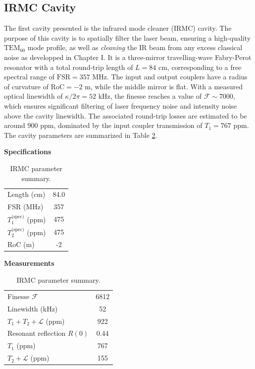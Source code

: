 \subsection{IRMC Cavity}
The first cavity presented is the infrared mode cleaner (IRMC) cavity. The purpose of this cavity is to spatially filter the laser beam, ensuring a high-quality $\text{TEM}_{00}$ mode profile, as well as \textit{cleaning} the IR beam from any excess classical noise as developped in Chapter I. It is a three-mirror travelling-wave Fabry-Perot resonator with a total round-trip length of $L = 84$ cm, corresponding to a free spectral range of $\mathrm{FSR} = 357$ MHz. The input and output couplers have a radius of curvature of $\mathrm{RoC} = -2$ m, while the middle mirror is flat. With a measured optical linewidth of $\kappa/2\pi = 52$ kHz, the finesse reaches a value of $\mathcal{F} \sim 7000$, which ensures significant filtering of laser frequency noise and intensity noise above the cavity linewidth. The associated round-trip losses are estimated to be around $900$ ppm, dominated by the input coupler transmission of $T_1 = 767$ ppm. The cavity parameters are summarized in Table \ref{tab:IRMC_params}. \\

\begin{table}[h!]
\centering
\captionsetup{width=\linewidth}
\begin{minipage}[t]{0.5\linewidth}
  \centering
  \textbf{Specifications}\par\medskip
  \begin{tabular}{lc}
    \hline
    Length (cm) & 84.0 \\
    FSR (MHz) & 357 \\
    $T_1^{\textrm{(spec)}}$ (ppm) & 475 \\
    $T_2^{\textrm{(spec)}}$ (ppm) & 475 \\
    RoC (m) & -2 \\ 
  \end{tabular}
\end{minipage}\hfill
\begin{minipage}[t]{0.5\linewidth}
  \centering
  \textbf{Measurements}\par\medskip
  \begin{tabular}{lc}
    \hline
    Finesse $\mathcal{F}$ & 6812 \\
    Linewidth (kHz) & 52 \\
    $T_1+T_2+\mathcal{L}$ (ppm) & 922 \\
    Resonant reflection $R(0)$ & 0.44 \\
    $T_1$ (ppm) & 767 \\
    $T_2+\mathcal{L}$ (ppm) & 155 \\ 
  \end{tabular}
\end{minipage}

\caption{IRMC parameter summary.}
\label{tab:IRMC_params}
\end{table}



